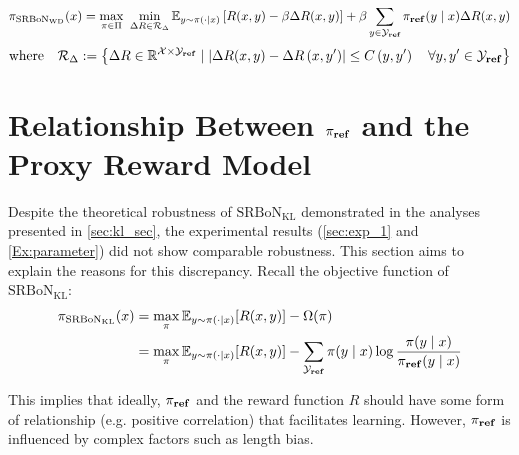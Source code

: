 \begin{equation*}
    \pi_{\mathrm{SRBoN}_\mathrm{WD}}(x) = \max_{\pi\in \Pi} \,\,\min_{\Delta R \in \mathcal{R}_{\Delta}}\mathbb{E}_{y \sim \pi(\cdot \mid x)}\left[R(x,y) - \beta \Delta R(x,y)\right] + \beta \sum_{y \in \mathcal{Y}_{\textbf{ref}}} \pi_{\textnormal{\textbf{ref}}}(y \mid x)\Delta R(x,y)
\end{equation*}
\begin{equation*}
\text{where}\quad \mathcal{R}_{\Delta}:=\left\{\Delta R \in \mathbb{R}^{\mathcal{X}\times\mathcal{Y}_{\textnormal{\textbf{ref}}}} \mid \left|\Delta R(x,y)-\Delta R\left(x,y^{\prime}\right)\right| \leq C\left(y, y^{\prime}\right) \quad \forall y, y^{\prime} \in \mathcal{Y}_{\textnormal{\textbf{ref}}}\right\}
\end{equation*}


\newpage
\section{Relationship Between $\pi_{\textnormal{\textbf{ref}}}$ and the Proxy Reward Model}\label{appendix:kl}
Despite the theoretical robustness of $\mathrm{SRBoN}_{\mathrm{KL}}$ demonstrated in the analyses presented in \cref{sec:kl_sec}, the experimental results (\cref{sec:exp_1} and \cref{Ex:parameter}) did not show comparable robustness. This section aims to explain the reasons for this discrepancy. Recall the objective function of $\mathrm{SRBoN}_{\mathrm{KL}}$:
\begin{equation*}
\begin{aligned}
\pi_{\mathrm{SRBoN}_\mathrm{KL}}(x) &=\max _{\pi}\mathbb{E}_{y \sim \pi(\cdot \mid x)} [R(x,y)]- \Omega(\pi)\\
&= \max _{\pi}\mathbb{E}_{y \sim \pi(\cdot \mid x)} [R(x,y)]- \sum_{\mathcal{Y}_{\textnormal{\textbf{ref}}}} \pi(y \mid x) \log\frac{\pi(y\mid x)}{\pi_{\textnormal{\textbf{ref}}}(y\mid x)}
\end{aligned}
\end{equation*}

This implies that ideally, $\pi_{\textnormal{\textbf{ref}}}$ and the reward function $R$ should have some form of relationship (e.g. positive correlation) that facilitates learning. However, $\pi_{\textnormal{\textbf{ref}}}$ is influenced by complex factors such as length bias. 

